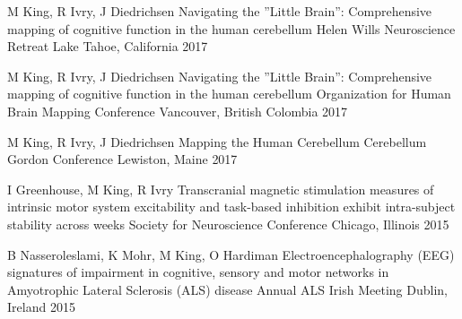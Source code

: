 \begin{cventries}
  \cventry
    {M King, R Ivry, J Diedrichsen} %
    {Navigating the ”Little Brain”: Comprehensive mapping of cognitive function in the human cerebellum} %
    {Helen Wills Neuroscience Retreat} %
    {Lake Tahoe, California} %
    {2017} %
    
  \cventry
    {M King, R Ivry, J Diedrichsen} %
    {Navigating the ”Little Brain”: Comprehensive mapping of cognitive function in the human cerebellum} %
    {Organization for Human Brain Mapping Conference} %
    {Vancouver, British Colombia} %
    {2017} %
    
  \cventry
    {M King, R Ivry, J Diedrichsen} %
    {Mapping the Human Cerebellum} %
    {Cerebellum Gordon Conference} %
    {Lewiston, Maine} %
    {2017} %
    
  \cventry
    {I Greenhouse, M King, R Ivry} %
    {Transcranial magnetic stimulation measures of intrinsic motor system excitability and task-based inhibition exhibit intra-subject stability across weeks} %
    {Society for Neuroscience Conference} %
    {Chicago, Illinois} %
    {2015} %
    
  \cventry
    {B Nasseroleslami, K Mohr, M King, O Hardiman} %
    {Electroencephalography (EEG) signatures of impairment in cognitive, sensory and motor networks in Amyotrophic Lateral Sclerosis (ALS) disease}%
    {Annual ALS Irish Meeting} %
    {Dublin, Ireland} %
    {2015} %

\end{cventries}
